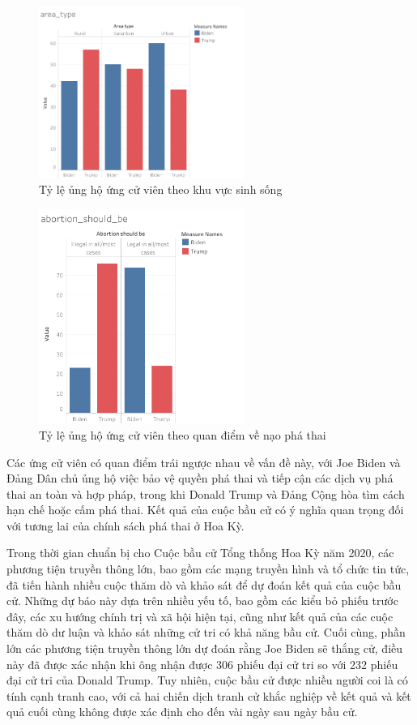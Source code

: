 \documentclass[14pt, a4paper]{article}
\numberwithin{equation}{section}
\numberwithin{figure}{section}
\numberwithin{dl}{section}
\numberwithin{md}{section}
\numberwithin{bd}{section}
\numberwithin{dn}{section}
\numberwithin{hq}{section}
\begin{document}
    \begin{figure}[h!]
        \centering
        \includegraphics[width=0.6\textwidth]{figures/area_type.png}
        \caption{Tỷ lệ ủng hộ ứng cử viên theo khu vực sinh sống}
    \end{figure}


    \begin{figure}[h!]
        \centering
        \includegraphics[width=0.6\textwidth]{figures/abortion_should_be.png}
        \caption{Tỷ lệ ủng hộ ứng cử viên theo quan điểm về nạo phá thai}
    \end{figure}

    Các ứng cử viên có quan điểm trái ngược nhau về vấn đề này, với Joe Biden và Đảng Dân chủ ủng hộ việc bảo vệ quyền phá thai và tiếp cận các dịch vụ phá thai an toàn và hợp pháp, trong khi Donald Trump và Đảng Cộng hòa tìm cách hạn chế hoặc cấm phá thai. 
    Kết quả của cuộc bầu cử có ý nghĩa quan trọng đối với tương lai của chính sách phá thai ở Hoa Kỳ.


    Trong thời gian chuẩn bị cho Cuộc bầu cử Tổng thống Hoa Kỳ năm 2020, các phương tiện truyền thông lớn, bao gồm các mạng truyền hình và tổ chức tin tức, đã tiến hành nhiều cuộc thăm dò và khảo sát để dự đoán kết quả của cuộc bầu cử. 
    Những dự báo này dựa trên nhiều yếu tố, bao gồm các kiểu bỏ phiếu trước đây, các xu hướng chính trị và xã hội hiện tại, cũng như kết quả của các cuộc thăm dò dư luận và khảo sát những cử tri có khả năng bầu cử. 
    Cuối cùng, phần lớn các phương tiện truyền thông lớn dự đoán rằng Joe Biden sẽ thắng cử, điều này đã được xác nhận khi ông nhận được 306 phiếu đại cử tri so với 232 phiếu đại cử tri của Donald Trump. 
    Tuy nhiên, cuộc bầu cử được nhiều người coi là có tính cạnh tranh cao, với cả hai chiến dịch tranh cử khắc nghiệp về kết quả và kết quả cuối cùng không được xác định cho đến vài ngày sau ngày bầu cử.
\end{document}
